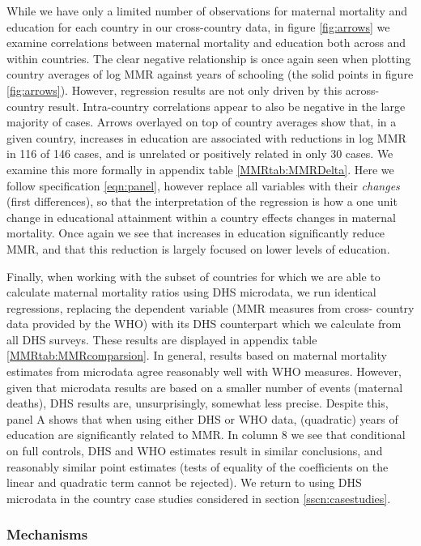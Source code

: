 \documentclass{article}[12pt,subeqn]
\begin{document}
\begin{spacing}{1.4}
While we have only a limited number of observations for maternal
mortality and education for each country in our cross-country data, in figure
\ref{fig:arrows} we examine correlations between maternal mortality and 
education both across and within countries.  The clear negative relationship
is once again seen when plotting country averages of log MMR against years of
schooling (the solid points in figure \ref{fig:arrows}).  However, regression
results are not only driven by this across-country result.  Intra-country
correlations appear to also be negative in the large majority of cases. Arrows
overlayed on top of country averages show that, in a given country, increases
in education are associated with reductions in log MMR in 116 of 146 cases,
and is unrelated or positively related in only 30 cases.  We examine this
more formally in appendix table \ref{MMRtab:MMRDelta}.  Here we follow
specification \ref{eqn:panel}, however replace all variables with their
\emph{changes} (first differences), so that the interpretation of the regression
is how a one unit change in educational attainment within a country effects
changes in maternal mortality.  Once again we see that increases in education
significantly reduce MMR, and that this reduction is largely focused on
lower levels of education.

Finally, when working with the subset of countries for which we are able to
calculate maternal mortality ratios using DHS microdata, we run identical
regressions, replacing the dependent variable (MMR measures from cross-%
country data provided by the WHO) with its DHS counterpart which we 
calculate from all DHS surveys.  These results are displayed in appendix table 
\ref{MMRtab:MMRcomparsion}.  In general, results based on maternal mortality
estimates from microdata agree reasonably well with WHO measures.  However,
given that microdata results are based on a smaller number of events (maternal
deaths), DHS results are, unsurprisingly, somewhat less precise.  Despite this, 
panel A shows that when using either DHS or WHO data, (quadratic) years of 
education are 
significantly related to MMR.  In column 8 we see that conditional on full
controls, DHS and WHO estimates result in similar conclusions, and reasonably
similar point estimates (tests of equality of the coefficients on the linear
and quadratic term cannot be rejected).  We return to using DHS microdata
in the country case studies considered in section \ref{sscn:casestudies}.

\subsubsection{Mechanisms}

\end{spacing}
\end{document}
